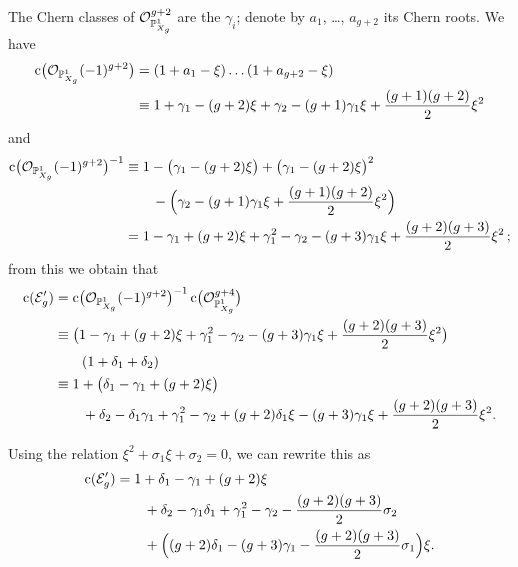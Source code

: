\documentclass{amsart}
\numberwithin{equation}{section}
\numberwithin{subsection}{section}
\theoremstyle{definition}
\theoremstyle{remark}
\newcommand\cE{\mathcal{E}} \newcommand\cF{\mathcal{F}}
\newcommand\cO{\mathcal{O}} \newcommand\cP{\mathcal{P}}
\newcommand{\ch}{\operatorname{c}}
\begin{document}
The Chern classes of $\cO_{\PP^1_{X_{g}}}^{g+2}$ are the $\gamma_{i}$; denote by $a_{1}$, \dots, $a_{g+2}$ its Chern roots.  We have
   \begin{align*}
   \ch\bigl(\cO_{\PP^1_{X_{g}}}(-1)^{g+2}\bigr) &=
   (1 + a_{1} -\xi) \dots (1 + a_{g+2} -\xi)\\
   &\equiv 1 + \gamma_{1} - (g+2)\xi 
      +\gamma_{2} - (g+1)\gamma_{1}\xi + \frac{(g+1)(g+2)}{2}\xi^{2}
   \end{align*}
and
   \begin{align*}
   \ch\bigl(\cO_{\PP^1_{X_{g}}}(-1)^{g+2}\bigr)^{-1} &\equiv
   1 - \bigl(\gamma_{1} - (g+2)\xi\bigr)
      + \bigl(\gamma_{1} - (g+2)\xi\bigr)^{2}\\
      &\qquad - \Bigl(\gamma_{2} - (g+1)\gamma_{1}\xi +
         \frac{(g+1)(g+2)}{2}\xi^{2}\Bigr)\\
   &=
   1 - \gamma_{1} + (g+2)\xi
   + \gamma_{1}^{2} - \gamma_{2}
   -(g+3)\gamma_{1}\xi
   +\frac{(g+2)(g+3)}{2}\xi^{2}\,;
   \end{align*}
from this we obtain that
   \begin{align*}
   \ch(\cE'_{g}) &= \ch\bigl(\cO_{\PP^1_{X_{g}}}(-1)^{g+2}\bigr)^{-1}
      \ch\bigl(\cO_{\PP^1_{X_{g}}}^{g+4}\bigr)\\
   &\equiv \bigl(1 - \gamma_{1} + (g+2)\xi
      + \gamma_{1}^{2} - \gamma_{2}
      -(g+3)\gamma_{1}\xi
      +\frac{(g+2)(g+3)}{2}\xi^{2}\bigr)\\
   &\qquad(1 + \delta_{1} + \delta_{2})\\
   &\equiv 1 + \bigl(\delta_{1} - \gamma_{1} + (g+2)\xi\bigr)\\
   &\qquad+ \delta_{2} - \delta_{1}\gamma_{1}
      + \gamma_{1}^{2} - \gamma_{2}
      +(g+2)\delta_{1}\xi
      -(g+3)\gamma_{1}\xi
      +\frac{(g+2)(g+3)}{2}\xi^{2}.
   \end{align*}

Using the relation $\xi^{2} + \sigma_{1}\xi + \sigma_{2} = 0$, we can rewrite this as
   \begin{align*}
   \ch(\cE'_{g}) &= 
   1 + \delta_{1} - \gamma_{1} + (g+2)\xi\\
   &\qquad+ \delta_{2} - \gamma_{1}\delta_{1}+ \gamma_{1}^{2} - \gamma_{2}
   -\frac{(g+2)(g+3)}{2}\sigma_{2}\\
   &\qquad + \Bigl(
   (g+2)\delta_{1} - (g+3)\gamma_{1} - \frac{(g+2)(g+3)}{2}\sigma_{1}
   \Bigr)\xi.
   \end{align*}
\end{document}

